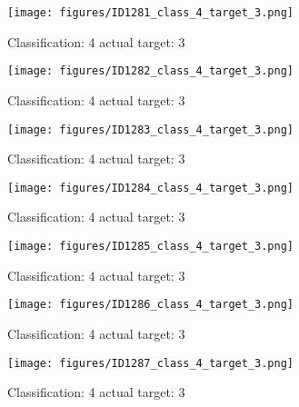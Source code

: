 \begin{figure}[h!]
\begin{center}
\texttt{[image: figures/ID1281\_class\_4\_target\_3.png]}
\end{center}
\caption{ Classification: 4 actual target: 3}
\label{fig:ID1281_class_4_target_3}
\end{figure}
\begin{figure}[h!]
\begin{center}
\texttt{[image: figures/ID1282\_class\_4\_target\_3.png]}
\end{center}
\caption{ Classification: 4 actual target: 3}
\label{fig:ID1282_class_4_target_3}
\end{figure}
\begin{figure}[h!]
\begin{center}
\texttt{[image: figures/ID1283\_class\_4\_target\_3.png]}
\end{center}
\caption{ Classification: 4 actual target: 3}
\label{fig:ID1283_class_4_target_3}
\end{figure}
\begin{figure}[h!]
\begin{center}
\texttt{[image: figures/ID1284\_class\_4\_target\_3.png]}
\end{center}
\caption{ Classification: 4 actual target: 3}
\label{fig:ID1284_class_4_target_3}
\end{figure}
\begin{figure}[h!]
\begin{center}
\texttt{[image: figures/ID1285\_class\_4\_target\_3.png]}
\end{center}
\caption{ Classification: 4 actual target: 3}
\label{fig:ID1285_class_4_target_3}
\end{figure}
\begin{figure}[h!]
\begin{center}
\texttt{[image: figures/ID1286\_class\_4\_target\_3.png]}
\end{center}
\caption{ Classification: 4 actual target: 3}
\label{fig:ID1286_class_4_target_3}
\end{figure}
\begin{figure}[h!]
\begin{center}
\texttt{[image: figures/ID1287\_class\_4\_target\_3.png]}
\end{center}
\caption{ Classification: 4 actual target: 3}
\label{fig:ID1287_class_4_target_3}
\end{figure}
